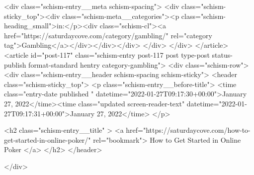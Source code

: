 {		<div class="schism-entry__meta schism-spacing">			<div class="schism-sticky_top"><div class="schism-meta__categories"><p class="schism-heading_small">in:</p><div class="schism-cl"><a href="https://saturdaycove.com/category/gambling/" rel="category tag">Gambling</a></div></div></div>		</div>
	</div>
</article>
<article id="post-117" class="schism-entry post-117 post type-post status-publish format-standard hentry category-gambling">
	<div class="schism-row">		<div class="schism-entry__header schism-spacing schism-sticky">			<header class="schism-sticky_top">				<p class="schism-entry__before-title">
					<time class="entry-date published " datetime="2022-01-27T09:17:30+00:00">January 27, 2022</time><time class="updated screen-reader-text" datetime="2022-01-27T09:17:31+00:00">January 27, 2022</time>				</p>

				<h2 class="schism-entry__title" >
					<a href="https://saturdaycove.com/how-to-get-started-in-online-poker/" rel="bookmark">
						How to Get Started in Online Poker					</a>
				</h2>
			</header>

					</div>

}
